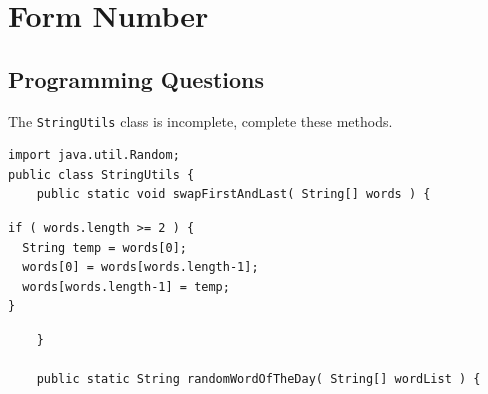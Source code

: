 \documentclass[11pt,answers]{exam}
\begin{document}
\section*{Form Number}
\begin{center}
\end{center}

\newpage

\begin{questions}
\section*{Programming Questions}

\question[11] The {\tt StringUtils} class is incomplete, complete these methods.

\begin{verbatim}
import java.util.Random;
public class StringUtils {
    public static void swapFirstAndLast( String[] words ) {
\end{verbatim}

\begin{solution}[2in]
\begin{lstlisting}
if ( words.length >= 2 ) {
  String temp = words[0];
  words[0] = words[words.length-1];
  words[words.length-1] = temp;
}
\end{lstlisting}
\end{solution}

\begin{verbatim}		
    } 
	
    public static String randomWordOfTheDay( String[] wordList ) {
\end{verbatim}


\end{questions}
\end{document}
